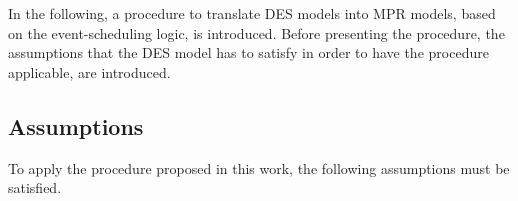 \documentclass[suppldata]{interact}
\theoremstyle{plain}
\theoremstyle{definition}
\theoremstyle{remark}
\begin{document}

In the following, a procedure to translate DES models into MPR models, based on the event-scheduling logic, is introduced. Before presenting the procedure, the assumptions that the DES model has to satisfy in order to have the procedure applicable, are introduced.

\subsection{Assumptions}
To apply the procedure proposed in this work, the following assumptions must be satisfied.
\end{document}
